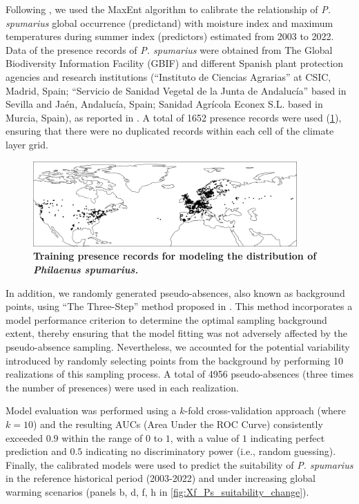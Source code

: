 Following \cite{Godefroid2022_vector}, we used the MaxEnt
\cite{phillips_maximum_2006} algorithm to calibrate the relationship of
\textit{P. spumarius} global occurrence (predictand) with moisture index and
maximum temperatures during summer index (predictors) estimated from 2003 to
2022. Data of the presence records of \textit{P. spumarius} were obtained from
The Global Biodiversity Information Facility (GBIF)
\cite{noauthor_what_nodate,GBIF} and different Spanish plant
protection agencies and research institutions (``Instituto de Ciencias
Agrarias'' at CSIC, Madrid, Spain; ``Servicio de Sanidad Vegetal de la Junta de
Andalucía'' based in Sevilla and Jaén, Andalucía, Spain; Sanidad Agrícola
Econex S.L. based in Murcia, Spain), as reported in
\cite{Godefroid2022_vector}. A total of 1652 presence records were used
(\cref{fig:Ps_presence_map}), ensuring that there were no duplicated records
within each cell of the climate layer grid.

\begin{figure}[ht]
    \centering
    \includegraphics[width=0.9\textwidth]{Figures/Ps_presence_map.pdf}
    \caption[Training presence records for modeling the
        distribution of \textit{Philaenus spumarius.}]{\textbf{Training
            presence
            records for modeling the
            distribution of \textit{Philaenus spumarius.}}}
    \label{fig:Ps_presence_map}
\end{figure}

In addition, we randomly generated pseudo-absences, also known as
background points, using ``The Three-Step'' method proposed in
\cite{Iturbide2015}. This method incorporates a model performance
criterion to determine the optimal sampling background extent, thereby ensuring
that the model fitting was not adversely affected by the pseudo-absence
sampling. Nevertheless, we accounted for the potential variability introduced
by randomly selecting points from the background by performing 10 realizations
of this sampling process. A total of 4956 pseudo-absences (three times the
number of presences) were used in each realization.

Model evaluation was performed using a $k$-fold cross-validation approach
(where $k = 10$) and the resulting AUCs (Area Under the ROC Curve) consistently
exceeded $0.9$ within the range of $0$ to $1$, with a value of $1$ indicating
perfect prediction and $0.5$ indicating no discriminatory power (i.e., random
guessing). Finally, the calibrated models were used to predict the suitability
of \textit{P. spumarius} in the reference historical period (2003-2022) and
under increasing global warming scenarios (panels b, d, f, h in
\cref{fig:Xf_Ps_suitability_change}).

